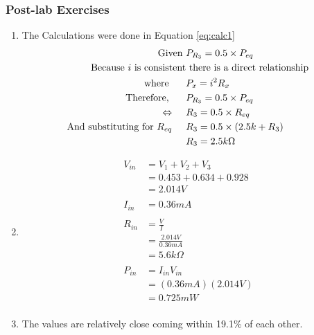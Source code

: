 {{{{{\subsubsection{Post-lab Exercises}
\begin{enumerate}
  \item The Calculations were done in Equation \ref{eq:calc1} \begin{equation}
    \begin{aligned}
      \text{Given } & P_{R_3} = 0.5\times P_{eq} \\
      \text{Because $i$ is consistent}& \text{ there is a direct relationship} \\
      \text{ where }\hspace{0.5cm} &
      P_x = i^2 R_x \\
      \text{Therefore, } \hspace{0.5cm} & P_{R_3} = 0.5\times P_{eq}\\
      \Leftrightarrow \hspace{0.5cm} & R_3 = 0.5 \times R_{eq}\\
      \text{And substituting for } R_{eq} \hspace{0.5cm} & R_3 = 0.5 \times (2.5k + R_3) \\
      & R_{3} = 2.5 k\Omega
    \end{aligned}\label{eq:calc1}
  \end{equation}
  \item \begin{equation}
    \begin{aligned}
      V_{in} & = V_{1}+V_{2}+V_{3}\\
      & = 0.453 + 0.634 + 0.928\\
      & = 2.014 V\\ \\
      I_{in} & = 0.36 mA\\ \\
      R_{in} & = \frac{V}{I}\\
      & = \frac{2.014 V}{0.36 mA}\\
      & =  5.6k \Omega\\ \\
      P_{in} & = I_{in} V_{in}\\
      & = (0.36 mA)(2.014 V)\\
      & =  0.725 mW\\
    \end{aligned}
  \end{equation}
  \item The values are relatively close coming within 19.1\% of each other.

\end{enumerate}}}}}}
